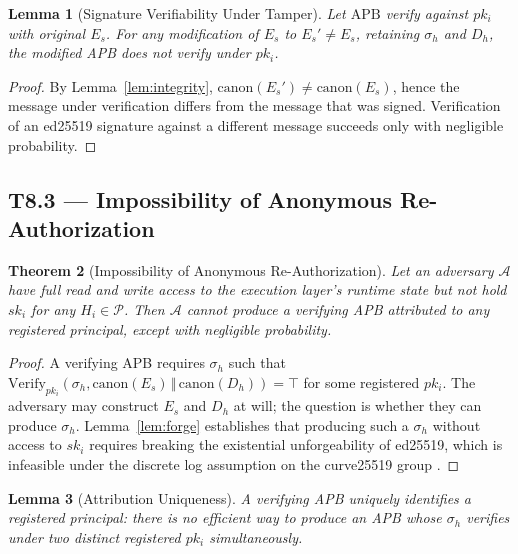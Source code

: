 \documentclass[11pt]{article}
\newtheorem{theorem}{Theorem}[section]
\newtheorem{lemma}[theorem]{Lemma}
\newcommand{\Pset}{\mathcal{P}}
\newcommand{\Es}{E_s}
\newcommand{\Dh}{D_h}
\newcommand{\sigh}{\sigma_h}
\newcommand{\Hi}{H_i}
\newcommand{\ski}{sk_i}
\newcommand{\pki}{pk_i}
\newcommand{\APB}{\mathrm{APB}}
\begin{document}
\begin{lemma}[Signature Verifiability Under Tamper]
\label{lem:tamper}
Let $\APB$ verify against $\pki$ with original $\Es$. For any
modification of $\Es$ to $\Es' \neq \Es$, retaining $\sigh$ and $\Dh$,
the modified APB does not verify under $\pki$.
\end{lemma}

\begin{proof}
By Lemma~\ref{lem:integrity}, $\mathrm{canon}(\Es') \neq
\mathrm{canon}(\Es)$, hence the message under verification differs
from the message that was signed. Verification of an ed25519
signature against a different message succeeds only with negligible
probability.
\end{proof}

\subsection{T8.3 --- Impossibility of Anonymous Re-Authorization}
\label{sec:t83}

\begin{theorem}[Impossibility of Anonymous Re-Authorization]
\label{thm:anonimp}
Let an adversary $\mathcal{A}$ have full read and write access to the
execution layer's runtime state but not hold $\ski$ for any
$\Hi \in \Pset$. Then $\mathcal{A}$ cannot produce a verifying APB
attributed to any registered principal, except with negligible
probability.
\end{theorem}

\begin{proof}
A verifying APB requires $\sigh$ such that
$\mathrm{Verify}_{\pki}(\sigh, \mathrm{canon}(\Es) \,\Vert\,
\mathrm{canon}(\Dh)) = \top$ for some registered $\pki$. The
adversary may construct $\Es$ and $\Dh$ at will; the question is
whether they can produce $\sigh$. Lemma~\ref{lem:forge} establishes
that producing such a $\sigh$ without access to $\ski$ requires
breaking the existential unforgeability of ed25519, which is
infeasible under the discrete log assumption on the curve25519
group \citep{bernstein2012highspeed}.
\end{proof}

\begin{lemma}[Attribution Uniqueness]
\label{lem:attribution}
A verifying APB uniquely identifies a registered principal: there is
no efficient way to produce an APB whose $\sigh$ verifies under two
distinct registered $\pki$ simultaneously.
\end{lemma}
\end{document}

